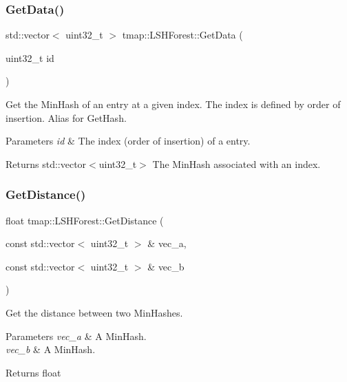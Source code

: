 \subsubsection{\texorpdfstring{Get\+Data()}{GetData()}}
{\footnotesize\ttfamily std\+::vector$<$ uint32\+\_\+t $>$ tmap\+::\+L\+S\+H\+Forest\+::\+Get\+Data (\begin{DoxyParamCaption}\item[{uint32\+\_\+t}]{id }\end{DoxyParamCaption})}



Get the Min\+Hash of an entry at a given index. The index is defined by order of insertion. Alias for Get\+Hash. 


\begin{DoxyParams}{Parameters}
{\em id} & The index (order of insertion) of a entry. \\
\hline
\end{DoxyParams}
\begin{DoxyReturn}{Returns}
std\+::vector$<$uint32\+\_\+t$>$ The Min\+Hash associated with an index. 
\end{DoxyReturn}
\mbox{\label{classtmap_1_1LSHForest_ab1c5e002deea04a625ab141f280bab92}} 
\subsubsection{\texorpdfstring{Get\+Distance()}{GetDistance()}}
{\footnotesize\ttfamily float tmap\+::\+L\+S\+H\+Forest\+::\+Get\+Distance (\begin{DoxyParamCaption}\item[{const std\+::vector$<$ uint32\+\_\+t $>$ \&}]{vec\+\_\+a,  }\item[{const std\+::vector$<$ uint32\+\_\+t $>$ \&}]{vec\+\_\+b }\end{DoxyParamCaption})}



Get the distance between two Min\+Hashes. 


\begin{DoxyParams}{Parameters}
{\em vec\+\_\+a} & A Min\+Hash. \\
\hline
{\em vec\+\_\+b} & A Min\+Hash. \\
\hline
\end{DoxyParams}
\begin{DoxyReturn}{Returns}
float 
\end{DoxyReturn}
\mbox{\label{classtmap_1_1LSHForest_a8fc81622125b40114951a61cbe90863f}} 
